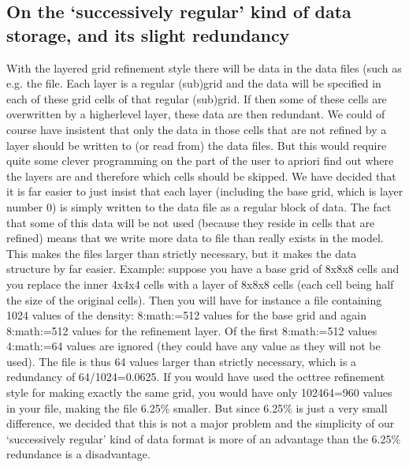 \documentclass[letterpaper,10pt,english]{sphinxmanual}
\begin{document}
\subsection{On the ‘successively regular’ kind of data storage, and its slight redundancy}
\label{\detokenize{gridding:on-the-successively-regular-kind-of-data-storage-and-its-slight-redundancy}}\label{\detokenize{gridding:sec-layer-amr-redundancy}}
With the layered grid refinement style there will be  data in the
data files (such as e.g. the  file. Each layer is a regular
(sub\sphinxhyphen{})grid and the data will be specified in each of these grid cells of that
regular (sub\sphinxhyphen{})grid.  If then some of these cells are overwritten by a
higher\sphinxhyphen{}level layer, these data are then redundant. We could of course have
insistent that only the data in those cells that are not refined by a layer
should be written to (or read from) the data files. But this would require quite
some clever programming on the part of the user to a\sphinxhyphen{}priori find out where the
layers are and therefore which cells should be skipped. We have decided that it
is far easier to just insist that each layer (including the base grid, which is
layer number 0) is simply written to the data file as a regular block of
data. The fact that some of this data will be not used (because they reside in
cells that are refined) means that we write more data to file than really exists
in the model. This makes the files larger than strictly necessary, but it makes
the data structure by far easier. Example: suppose you have a base grid of 8x8x8
cells and you replace the inner 4x4x4 cells with a layer of 8x8x8 cells (each
cell being half the size of the original cells).  Then you will have for
instance a  file containing 1024 values of the density:
8:math:=512 values for the base grid and again 8:math:=512 values for
the refinement layer. Of the first 8:math:=512 values 4:math:=64 values
are ignored (they could have any value as they will not be used). The file is
thus 64 values larger than strictly necessary, which is a redundancy of
64/1024=0.0625. If you would have used the oct\sphinxhyphen{}tree refinement style for making
exactly the same grid, you would have only 1024\sphinxhyphen{}64=960 values in your file,
making the file 6.25\% smaller. But since 6.25\% is just a very small
difference, we decided that this is not a major problem and the simplicity of
our ‘successively regular’ kind of data format is more of an advantage than the
6.25\% redundance is a disadvantage.
\end{document}
